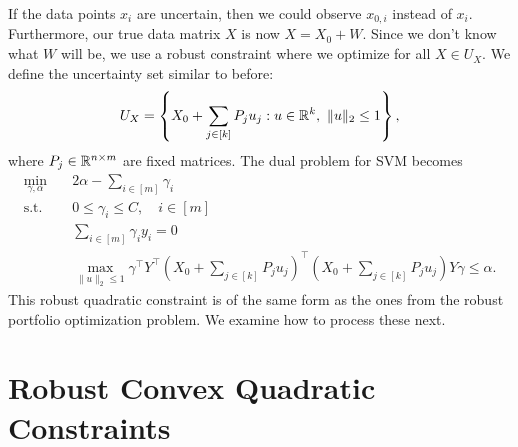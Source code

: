 \documentclass[11pt,oneside]{article}
\theoremstyle{plain}
\theoremstyle{definition}
\theoremstyle{remark}
\begin{document}
If the data points $x_i$ are uncertain, then we could observe $x_{0,i}$ instead of $x_i$. Furthermore, our true data matrix $X$ is now $X = X_0 + W$. Since we don't know what $W$ will be, we use a robust constraint where we optimize for all $X \in U_X$. We define the uncertainty set similar to before:
\[U_X = \left\{ X_0 + \sum_{j \in [k]} P_j u_j : u \in \mathbb{R}^k, \ \|u\|_2 \leq 1 \right\},\]
where $P_j \in \mathbb{R}^{n \times m}$ are fixed matrices. The dual problem for SVM becomes
\begin{align*}
\min_{\gamma,\alpha} &\quad 2 \alpha - \sum_{i \in [m]} \gamma_i\\
\text{s.t.} &\quad 0 \leq \gamma_i \leq C, \quad i \in [m]\\
&\quad \sum_{i \in [m]} \gamma_i y_i = 0\\
&\quad \max_{\|u\|_2 \leq 1} \gamma^\top Y^\top \left(X_0 + \sum_{j \in [k]} P_j u_j\right)^\top \left(X_0 + \sum_{j \in [k]} P_j u_j\right) Y \gamma \leq \alpha.
\end{align*}
This robust quadratic constraint is of the same form as the ones from the robust portfolio optimization problem. We examine how to process these next.

\section{Robust Convex Quadratic Constraints}
\end{document}
